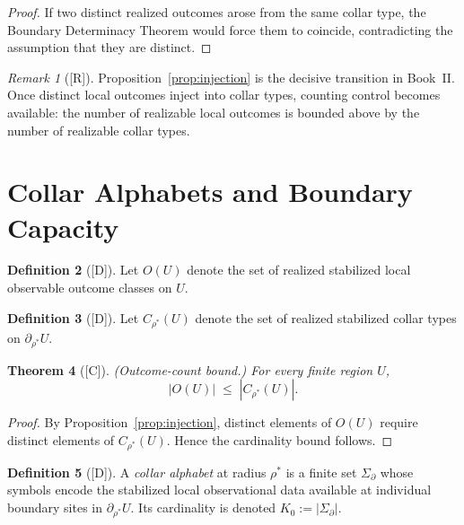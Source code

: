 \documentclass[12pt,oneside]{amsbook}
\theoremstyle{plain}
\newtheorem{theorem}{Theorem}[section]
\theoremstyle{definition}
\newtheorem{definition}[theorem]{Definition}
\theoremstyle{remark}
\newtheorem{remark}[theorem]{Remark}
\newcommand{\status}[1]{\textup{[#1]}}
\begin{document}
\begin{proof}
If two distinct realized outcomes arose from the same collar type,
the Boundary Determinacy Theorem would force them to coincide,
contradicting the assumption that they are distinct.
\end{proof}

\begin{remark}[\status{R}]\label{rmk:injection-decisive}
Proposition~\ref{prop:injection} is the decisive transition in
Book~II.  Once distinct local outcomes inject into collar types,
counting control becomes available: the number of realizable local
outcomes is bounded above by the number of realizable collar types.
\end{remark}

\section{Collar Alphabets and Boundary Capacity}
\label{sec:capacity}

\begin{definition}[\status{D}]\label{def:realized-outcomes}
Let $O(U)$ denote the set of realized stabilized local observable
outcome classes on $U$.
\end{definition}

\begin{definition}[\status{D}]\label{def:realized-collar}
Let $C_{\rho^*}(U)$ denote the set of realized stabilized collar types
on $\partial_{\rho^*} U$.
\end{definition}

\begin{theorem}[\status{C}]\label{thm:outcome-count}
\textup{(Outcome-count bound.)}  For every finite region $U$,
\[
  |O(U)| \;\leq\; |C_{\rho^*}(U)|.
\]
\end{theorem}

\begin{proof}
By Proposition~\ref{prop:injection}, distinct elements of $O(U)$
require distinct elements of $C_{\rho^*}(U)$.  Hence the cardinality
bound follows.
\end{proof}

\begin{definition}[\status{D}]\label{def:collar-alphabet}
A \emph{collar alphabet} at radius $\rho^*$ is a finite set
$\Sigma_\partial$ whose symbols encode the stabilized local
observational data available at individual boundary sites in
$\partial_{\rho^*} U$.  Its cardinality is denoted $K_0 :=
|\Sigma_\partial|$.
\end{definition}
\end{document}

